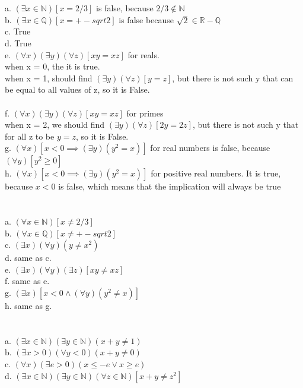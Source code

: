 \documentclass{article}
\begin{document}
\section{}
a. $(\exists x \in \mathbb{N})[x=2/3]$ is false, because $2/3 \notin \mathbb{N}$ \\
b. $(\exists x \in \mathbb{Q})[x=+-sqrt 2]$ is false because $\sqrt 2 \in \mathbb{R} - \mathbb{Q}$\\
c. True \\
d. True \\
e. $(\forall x)(\exists y)(\forall z)[xy = xz]$ for reals.\\
when x = 0, the it is true. \\
when x = 1, should find $(\exists y)(\forall z)[y = z]$, but there is not such y that can be equal to all values of z, so it is False.\\
\\
f. $(\forall x)(\exists y)(\forall z)[xy = xz]$ for primes\\
when x = 2, we should find $(\exists y)(\forall z)[2y = 2z]$, but there is not such y that for all z to be $y = z$, so it is False.\\
g. $(\forall x)[x < 0 \implies (\exists y)(y^2 = x)]$ for real numbers is false, because $(\forall y)[y^2 \geq 0]$\\
h. $(\forall x)[x < 0 \implies (\exists y)(y^2 = x)]$ for positive real numbers. It is true, because $x < 0$ is false, which means that the implication will always be true \\

\section{}
a. $(\forall x \in \mathbb{N})[x \neq 2/3]$\\
b. $(\forall x \in \mathbb{Q})[x \neq +-sqrt 2]$\\
c. $(\exists x)(\forall y)(y \neq x^2)$\\
d. same as c.\\
e. $(\exists x)(\forall y)(\exists z)[xy \neq xz]$\\
f. same as e.\\
g. $(\exists x)[x < 0 \wedge (\forall y)(y^2 \neq x)]$\\
h. same as g.\\


\section{}
a. $(\exists x \in \mathbb{N})(\exists y \in \mathbb{N})(x+y \neq 1)$\\
b. $(\exists x > 0)(\forall y < 0)(x+y \neq 0)$\\
c. $(\forall x)(\exists e > 0)(x \leq -e \vee x \geq e)$\\
d. $(\exists x \in \mathbb{N})(\exists y \in \mathbb{N})(\forall z \in \mathbb{N})[x + y \neq z^2]$\\
\end{document}
